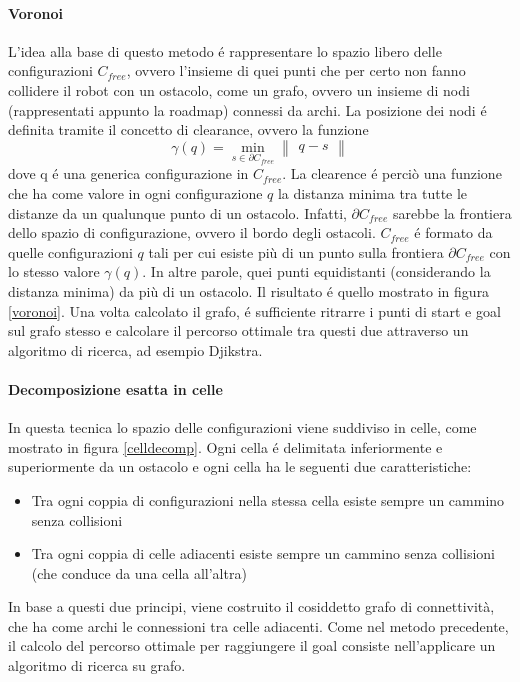 \documentclass[14pt,a4paper]{extarticle}
\begin{document}
\paragraph{Voronoi} L'idea alla base di questo metodo é rappresentare lo spazio libero delle configurazioni \(C_{free}\), ovvero l'insieme di quei punti che per certo non fanno collidere il robot con un ostacolo, come un grafo, ovvero un insieme di nodi (rappresentati appunto la roadmap) connessi da archi. La posizione dei nodi é definita tramite il concetto di clearance, ovvero la funzione \[\gamma(q) = \min_{s\in\partial C_{free}} \begin{Vmatrix}q-s\end{Vmatrix}\] dove q é una generica configurazione in \(C_{free}\). La clearence é perciò una funzione che ha come valore in ogni configurazione \(q\) la distanza minima tra tutte le distanze da un qualunque punto di un ostacolo. Infatti, \(\partial C_{free}\) sarebbe la frontiera dello spazio di configurazione, ovvero il bordo degli ostacoli. \(C_{free}\) é formato da quelle configurazioni \(q\) tali per cui esiste più di un punto sulla frontiera \(\partial C_{free}\) con lo stesso valore \(\gamma(q)\). In altre parole, quei punti equidistanti (considerando la distanza minima) da più di un ostacolo. Il risultato é quello mostrato in figura \ref{voronoi}. Una volta calcolato il grafo, é sufficiente ritrarre i punti di start e goal sul grafo stesso e calcolare il percorso ottimale tra questi due attraverso un algoritmo di ricerca, ad esempio Djikstra.

\paragraph{Decomposizione esatta in celle} In questa tecnica lo spazio delle configurazioni viene suddiviso in celle, come mostrato in figura \ref{celldecomp}. Ogni cella é delimitata inferiormente e superiormente da un ostacolo e ogni cella ha le seguenti due caratteristiche:
\begin{itemize}
\item Tra ogni coppia di configurazioni nella stessa cella esiste sempre un cammino senza collisioni
\item Tra ogni coppia di celle adiacenti esiste sempre un cammino senza collisioni (che conduce da una cella all'altra)
\end{itemize}
In base a questi due principi, viene costruito il cosiddetto grafo di connettività, che ha come archi le connessioni tra celle adiacenti. Come nel metodo precedente, il calcolo del percorso ottimale per raggiungere il goal consiste nell'applicare un algoritmo di ricerca su grafo.
\end{document}
